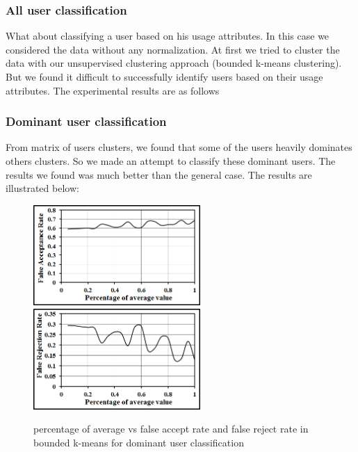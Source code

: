 \subsubsection{All user classification}
What about classifying a user based on his usage attributes. In this case we considered the data without any normalization. At first we tried to cluster the data with our unsupervised clustering approach (bounded k-means clustering). But we found it difficult to successfully identify users based on their usage attributes.
The experimental results are as follows


\subsubsection{Dominant user classification}
From matrix of users clusters, we found that some of the users heavily dominates others clusters. So we made an attempt to classify these dominant users. The results we found was much better than the general case. The results are illustrated below:

\begin{figure}
\centering
\includegraphics[width=2.5in,clip,keepaspectratio]{Chapters/figures/User/dominant/fA}
\includegraphics[width=2.5in,clip,keepaspectratio]{Chapters/figures/User/dominant/fR}
\caption{percentage of average vs false accept rate and false reject rate in bounded k-means for dominant user classification}
\label{Optional 6}
\end{figure}


